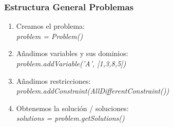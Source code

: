 \documentclass[xcolor=table]{beamer}
\begin{document}
\begin{frame} \frametitle{Estructura General Problemas}  \footnotesize  

\begin{enumerate}
    \item Creamos el problema: \\
        \textit{problem = Problem()}
    \item Añadimos variables y sus dominios:\\ 
            \textit{problem.addVariable('A', [1,3,8,5])}
    \item Añadimos restricciones:\\ 
            \textit{problem.addConstraint(AllDifferentConstraint())}
    \item Obtenemos la solución / soluciones:\\
            \textit{solutions = problem.getSolutions()}
\end{enumerate}
\end{frame} 
\end{document}
